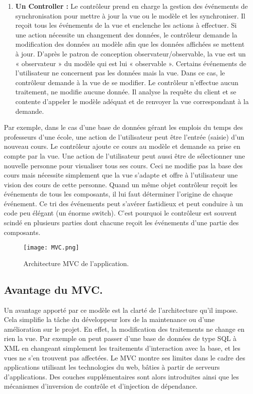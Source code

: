 \begin{enumerate}
	\item  \textbf{Un Controller :}
	Le contrôleur prend en charge la gestion des événements de synchronisation pour mettre à jour la vue ou le modèle et les synchroniser. Il reçoit tous les événements de la vue et enclenche les actions à effectuer. Si une action nécessite un changement des données, le contrôleur demande la modification des données au modèle afin que les données affichées se mettent à jour. D’après le patron de conception observateur/observable, la vue est un « observateur » du modèle qui est lui « observable ». Certains événements de l’utilisateur ne concernent pas les données mais la vue. Dans ce cas, le contrôleur demande à la vue de se modifier. Le contrôleur n’effectue aucun traitement, ne modifie aucune donnée. Il analyse la requête du client et se contente d’appeler le modèle adéquat et de renvoyer la vue correspondant à la demande. 
\end{enumerate}

Par exemple, dans le cas d’une base de données gérant les emplois du temps des professeurs d’une école, une action de l’utilisateur peut être l’entrée (saisie) d’un nouveau cours. Le contrôleur ajoute ce cours au modèle et demande sa prise en compte par la vue. Une action de l’utilisateur peut aussi être de sélectionner une nouvelle personne pour visualiser tous ses cours. Ceci ne modifie pas la base des cours mais nécessite simplement que la vue s’adapte et offre à l’utilisateur une vision des cours de cette personne. Quand un même objet contrôleur reçoit les événements de tous les composants, il lui faut déterminer l’origine de chaque événement. Ce tri des événements peut s’avérer fastidieux et peut conduire à un code peu élégant (un énorme switch). C’est pourquoi le contrôleur est souvent scindé en plusieurs parties dont chacune reçoit les événements d’une partie des composants. 

\begin{figure}[H]
	\centering
	\texttt{[image: MVC.png]}
	\caption{Architecture MVC de l'application.}
	\label{fig:sp0}
\end{figure}

\subsection{Avantage du MVC.}

Un avantage apporté par ce modèle est la clarté de l’architecture qu’il impose. Cela simplifie la tâche du développeur lors de la maintenance ou d’une amélioration sur le projet. En effet, la modification des traitements ne change en rien la vue. Par exemple on peut passer d’une base de données de type SQL à XML en changeant simplement les traitements d’interaction avec la base, et les vues ne s’en trouvent pas affectées. Le MVC montre ses limites dans le cadre des applications utilisant les technologies du web, bâties à partir de serveurs d’applications. Des couches supplémentaires sont alors introduites ainsi que les mécanismes d’inversion de contrôle et d’injection de dépendance. 

